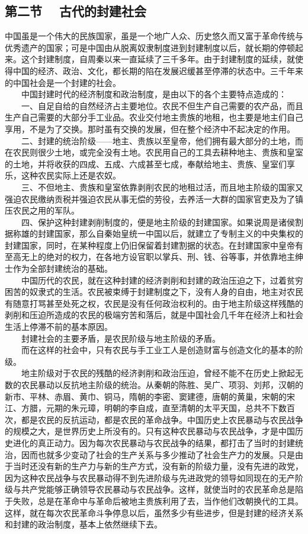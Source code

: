 \documentclass[cn,11pt,chinese]{elegantbook}
\def\myformat#1{\hfil\hfil #1}
\begin{document}
\subsection*{\myformat{第二节　 古代的封建社会}}
中国虽是一个伟大的民族国家，虽是一个地广人众、历史悠久而又富于革命传统与优秀遗产的国家；可是中国由从脱离奴隶制度进到封建制度以后，就长期的停顿起来。这个封建制度，自周秦以来一直延续了三千多年。由于封建制度的延续，就使得中国的经济、政治、文化，都长期的陷在发展迟缓甚至停滞的状态中。三千年来的中国社会是一个封建的社会。\\
　　中国封建时代的经济制度和政治制度，是由以下的各个主要特点造成的：\\
　　一、自足自给的自然经济占主要地位。农民不但生产自己需要的农产品，而且生产自己需要的大部分手工业品。农业交付地主贵族的地租，也主要是地主们自己享用，不是为了交换。那时虽有交换的发展，但在整个经济中不起决定的作用。\\
　　二、封建的统治阶级——地主、贵族以至皇帝，他们拥有最大部分的土地，而在农民则很少土地，或完全没有土地。农民用自己的工具去耕种地主、贵族和皇室的土地，并将收获的四成、五成、六成甚至七成，奉献给地主、贵族、皇室们享乐，这种农民实际上还是农奴。\\
　　三、不但地主、贵族和皇室依靠剥削农民的地租过活，而且地主阶级的国家又强迫农民缴纳贡税并强迫农民从事无偿的劳役，去养活一大群的国家官吏及为了镇压农民之用的军队。\\
　　四、保护这种封建剥削制度的，便是地主阶级的封建国家。如果说周是诸侯割据称雄的封建国家，那么自秦始皇统一中国以后，就建立了专制主义的中央集权的封建国家，同时，在某种程度上仍旧保留着封建割据的状态。在封建国家中皇帝有至高无上的绝对的权力，在各地方设官职以掌兵、刑、钱、谷等事，并依靠地主绅士作为全部封建统治的基础。\\
　　中国历代的农民，就在这种封建的经济剥削和封建的政治压迫之下，过着贫穷困苦的奴隶式的生活。农民被束缚于封建制度之下，没有人身的自由，地主对农民有随意打骂甚至处死之权，农民是没有任何政治权利的。由于地主阶级这样残酷的剥削和压迫所造成的农民的极端穷苦和落后，就是中国社会几千年在经济上和社会生活上停滞不前的基本原因。\\
　　封建社会的主要矛盾，是农民阶级与地主阶级的矛盾。\\
　　而在这样的社会中，只有农民与手工业工人是创造财富与创造文化的基本的阶级。\\
　　地主阶级对于农民的残酷的经济剥削和政治压迫，曾经不能不在历史上掀起无数的农民暴动以反抗地主阶级的统治。从秦朝的陈胜、吴广、项羽、刘邦，汉朝的新市、平林、赤眉、黄巾、铜马，隋朝的李密、窦建德，唐朝的黄巢，宋朝的宋江、方腊，元期的朱元璋，明朝的李自成，直至清朝的太平天国，总共不下数百次，都是农民的反抗运动，都是农民的革命战争。中国历史上农民暴动与农民战争的规模之大，是世界历史上所没有的。只有这种农民暴动与农民战争，才是中国历史进化的真正动力。因为每次农民暴动与农民战争的结果，都打击了当时的封建统治，因而也就多少变动了社会的生产关系与多少推动了社会生产力的发展。只是由于当时还没有新的生产力与新的生产方式，没有新的阶级力量，没有先进的政党，因为这种农民战争与农民暴动得不到先进阶级与先进政党的领导如同现在的无产阶级与共产党能够正确领导农民暴动与农民战争。这样，就使当时的农民革命总是陷于失败，总是在革命中与革命后被地主贵族利用了去，当作他们改朝换代的工具。这样，就在每次农民革命斗争停息以后，虽然多少有些进步，但是封建的经济关系和封建的政治制度，基本上依然继续下去。\\
\end{document}

